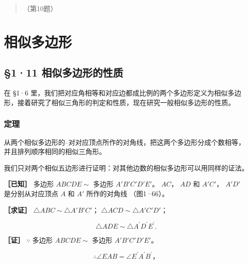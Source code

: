 \begin{quote}
（第10题）
\end{quote}

\section{相似多边形}

\subsection{§1·11
相似多边形的性质}

在 §1·6
里，我们把对应角相等和对应边都成比例的两个多边形定义为相似多边形，接着研究了相似三角形的判定和性质，现在研究一般相似多边形的性质。

\subsubsection{定理}

从两个相似多边形的--对对应顶点所作的对角线，把这两个多边形分成个数相等，并且排列顺序相同的相似三角形。

我们只对两个相似五边形进行证明：对其他边数的相似多边形可以用同样的证法。

\textbf{［已知］} 多边形 \(ABCDE \sim\) 多边形 \(A'B'C'D'E'\)。 \(AC\)，
\(AD\) 和 \(A'C'\)， \(A'D'\) 是分别从对应顶点 \(A\) 和 \(A'\)
所作的对角线 （图1·66）。

\textbf{［求证］} \(\triangle ABC \sim \triangle A'B'C'\)；
\(\triangle ACD \sim \triangle A'C'D'\)；

\[
\triangle A D E \sim \triangle A ^ {\prime} D ^ {\prime} E ^ {\prime}.
\]

\textbf{［证］} \(\because\) 多边形 \(ABCDE \sim\) 多边形
\(A'B'C'D'E'\)。

\[
\therefore \angle E A B = \angle E ^ {\prime} A ^ {\prime} B ^ {\prime}\text{，} \tag {1}
\]

